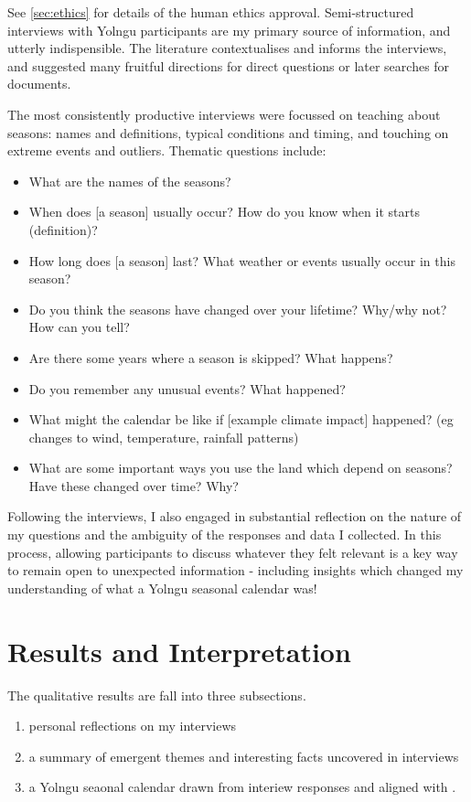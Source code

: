 See \autoref{sec:ethics} for details of the human ethics approval.
Semi-structured interviews with Yolngu participants are my primary source
of information, and utterly indispensible.
The literature contextualises and informs the interviews, and suggested many fruitful
directions for direct questions or later searches for documents.

The most consistently productive interviews were focussed on teaching about
seasons: names and definitions, typical conditions and timing, and touching on
extreme events and outliers. Thematic questions include:
\begin{itemize}
\item What are the names of the seasons?
\item When does [a season] usually occur?  How do you know when it starts (definition)?
\item How long does [a season] last?  What weather or events usually occur in this season?
\item Do you think the seasons have changed over your lifetime?  Why/why not?  How can you tell?
\item Are there some years where a season is skipped?  What happens?
\item Do you remember any unusual events?  What happened?
\item What might the calendar be like if [example climate impact] happened? 
      (eg changes to wind, temperature, rainfall patterns) 
\item What are some important ways you use the land which depend on seasons?  Have these changed over time?  Why?
\end{itemize}

Following the interviews, I also engaged in substantial reflection on the nature
of my questions and the ambiguity of the responses and data I collected.
In this process, allowing participants to discuss whatever they felt relevant
is a key way to remain open to unexpected information - including insights
which changed my understanding of what a Yolngu seasonal calendar was!



\section{Results and Interpretation}

The qualitative results are fall into three subsections.
\begin{enumerate}
\item personal reflections on my interviews
\item a summary of emergent themes and interesting facts uncovered in interviews
\item a Yolngu seaonal calendar drawn from interiew responses and aligned with \citet{davis1989}.
\end{enumerate}


